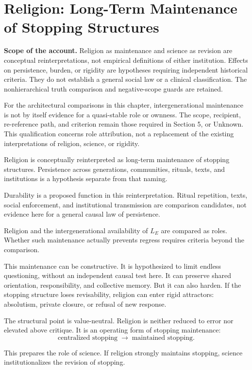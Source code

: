 \section{Religion: Long-Term Maintenance of Stopping Structures}

\noindent\textbf{Scope of the account.} Religion as maintenance and science as revision are conceptual reinterpretations, not empirical definitions of either institution. Effects on persistence, burden, or rigidity are hypotheses requiring independent historical criteria. They do not establish a general social law or a clinical classification. The nonhierarchical truth comparison and negative-scope guards are retained.

For the architectural comparisons in this chapter, intergenerational maintenance is not by itself evidence for a quasi-stable role or ownness. The scope, recipient, re-reference path, and criterion remain those required in Section 5, or Unknown. This qualification concerns role attribution, not a replacement of the existing interpretations of religion, science, or rigidity.


Religion is conceptually reinterpreted as long-term maintenance of stopping structures. Persistence across generations, communities, rituals, texts, and institutions is a hypothesis separate from that naming.

Durability is a proposed function in this reinterpretation. Ritual repetition, texts, social enforcement, and institutional transmission are comparison candidates, not evidence here for a general causal law of persistence.

Religion and the intergenerational availability of $L_E$ are compared as roles. Whether such maintenance actually prevents regress requires criteria beyond the comparison.

This maintenance can be constructive. It is hypothesized to limit endless questioning, without an independent causal test here. It can preserve shared orientation, responsibility, and collective memory. But it can also harden. If the stopping structure loses revisability, religion can enter rigid attractors: absolutism, private closure, or refusal of new response.

The structural point is value-neutral. Religion is neither reduced to error nor elevated above critique. It is an operating form of stopping maintenance:
\[
\text{centralized stopping} \;\longrightarrow\; \text{maintained stopping}.
\]

This prepares the role of science. If religion strongly maintains stopping, science institutionalizes the revision of stopping.

\bigskip
